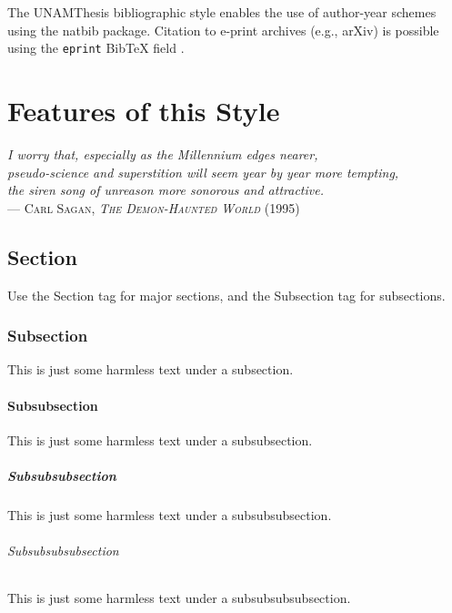 \documentclass[11pt,spanish]{report}
\begin{document}
The UNAMThesis bibliographic style enables the use of author-year schemes using the natbib
package. Citation to e-print archives (e.g., arXiv) is possible using the \texttt{eprint}
{{\sc Bib}\TeX} field \citep{Keseler2005,Leskovec2008,Lipschutz1986,Marconi1967,
Neidhardt1996,Nelson2000}.

\chapter{Features of this Style}

\begin{quotenat}
\textsl{I worry that, especially as the Millennium edges nearer,\\
pseudo-science and superstition will seem year by year more tempting,\\
the siren song of unreason more sonorous and attractive.}\\
--- \textsc{Carl Sagan, \textit{The Demon-Haunted World} (1995)}

\end{quotenat}

\section{Section}

Use the Section tag for major sections, and the Subsection tag for subsections.

\subsection{Subsection}

This is just some harmless text under a subsection.

\subsubsection{Subsubsection}

This is just some harmless text under a subsubsection.

\paragraph{Subsubsubsection}

This is just some harmless text under a subsubsubsection.

\subparagraph{Subsubsubsubsection}

This is just some harmless text under a subsubsubsubsection.
\end{document}
